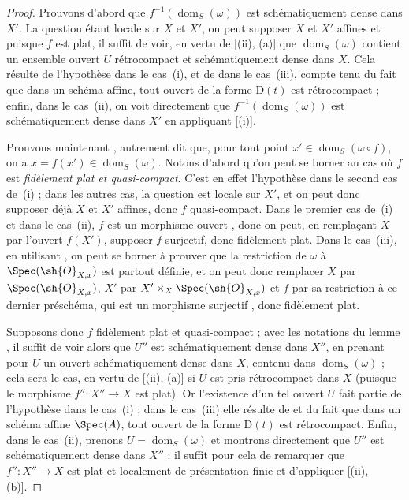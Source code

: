 \begin{proof}
Prouvons d'abord que $f^{-1}(\operatorname{dom}_S(\omega))$ est schématiquement dense dans $X'$.
La question étant locale sur $X$ et $X'$, on peut supposer $X$ et $X'$ affines et puisque $f$ est plat, il suffit de voir, en vertu de [(ii), (a)] que $\operatorname{dom}_S(\omega)$ contient un ensemble ouvert $U$ rétrocompact et schématiquement dense dans $X$.
Cela résulte de l'hypothèse dans le cas~(i), et de  dans le cas~(iii), compte tenu du fait que dans un schéma affine, tout ouvert de la forme $\mathrm{D}(t)$ est rétrocompact ; enfin, dans le cas~(ii), on voit directement que $f^{-1}(\operatorname{dom}_S(\omega))$ est schématiquement dense dans $X'$ en appliquant [(i)].

Prouvons maintenant , autrement dit que, pour tout point $x'\in\operatorname{dom}_S(\omega\circ f)$, on a $x=f(x')\in\operatorname{dom}_S(\omega)$.
Notons d'abord qu'on peut se borner au cas où $f$ est \emph{fidèlement plat et quasi-compact}.
C'est en effet l'hypothèse dans le second cas de~(i) ; dans les autres cas, la question est locale sur $X'$, et on peut donc supposer déjà $X$ et $X'$ affines, donc $f$ quasi-compact.
Dans le premier cas de~(i) et dans le cas~(ii), $f$ est un morphisme ouvert , donc on peut, en remplaçant $X$ par l'ouvert $f(X')$, supposer $f$ surjectif, donc fidèlement plat.
Dans le cas~(iii), en utilisant , on peut se borner à prouver que la restriction de $\omega$ à $\Spec(\sh{O}_{X,x})$ est partout définie, et on peut donc remplacer $X$ par $\Spec(\sh{O}_{X,x})$, $X'$ par $X'\times_X\Spec(\sh{O}_{X,x})$ et $f$ par sa restriction à ce dernier préschéma, qui est un morphisme surjectif , donc fidèlement plat.

Supposons donc $f$ fidèlement plat et quasi-compact ; avec les notations du lemme , il suffit de voir alors que $U''$ est schématiquement dense dans $X''$, en prenant pour $U$ un ouvert schématiquement dense dans $X$, contenu dans $\operatorname{dom}_S(\omega)$ ; cela sera le cas, en vertu de [(ii), (a)] si $U$ est pris rétrocompact dans $X$ (puisque le morphisme $f'':X''\to X$ est plat).
Or l'existence d'un tel ouvert $U$ fait partie de l'hypothèse dans le cas~(i) ; dans le cas~(iii) elle résulte de  et du fait que dans un schéma affine $\Spec(A)$, tout ouvert de la forme $\mathrm{D}(t)$ est rétrocompact.
Enfin, dans le cas~(ii), prenons $U=\operatorname{dom}_S(\omega)$ et montrons directement que $U''$ est schématiquement dense dans $X''$ : il suffit pour cela de remarquer que $f'':X''\to X$ est plat et localement de présentation finie et d'appliquer [(ii), (b)].
\end{proof}


